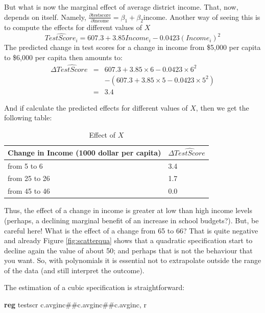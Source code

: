 \documentclass[
]{book}
\newenvironment{Shaded}{\begin{snugshade}}{\end{snugshade}}
\newcommand{\FunctionTok}[1]{\textcolor[rgb]{0.00,0.00,0.00}{#1}}
\newcommand{\KeywordTok}[1]{\textcolor[rgb]{0.13,0.29,0.53}{\textbf{#1}}}
\newcommand{\NormalTok}[1]{#1}
\begin{document}
But what is now the marginal effect of average district income. That, now, depends on itself. Namely, \(\frac{\partial \text{testscore}}{\partial \text{income}} = \beta_1 + \beta_2 \text{income}\). Another way of seeing this is to compute the effects for different values of \(X\)
\begin{equation}
\widehat{TestScore_i} = 607.3 + 3.85 Income_i - 0.0423(Income_i)^2
\end{equation}
The predicted change in test scores for a change in income from \$5,000 per capita to \$6,000 per capita then amounts to:
\begin{eqnarray}
\Delta \widehat{TestScore} &=& 607.3 + 3.85 \times 6 -  0.0423 \times 6^2 \\
&& - (607.3 + 3.85\times 5 - 0.0423\times 5^2)\\
&=&3.4
\end{eqnarray}

And if calculate the predicted effects for different values of \(X\), then we get the following table:

\begin{table}

\caption{\label{tab:effectqua}Effect of $X$}
\centering
\begin{tabular}[t]{ll}
\toprule
Change in Income (1000 dollar per capita) & $\Delta \widehat{TestScore}$\\
\midrule
from 5 to 6 & 3.4\\
from 25 to 26 & 1.7\\
from 45 to 46 & 0.0\\
\bottomrule
\end{tabular}
\end{table}

Thus, the effect of a change in income is greater at low than high income levels (perhaps, a declining marginal benefit of an increase in school budgets?). But, be careful here! What is the effect of a change from 65 to 66? That is quite negative and already Figure \ref{fig:scatterqua} shows that a quadratic specification start to decline again the value of about 50; and perhaps that is not the behaviour that you want. So, with polynomials it is essential not to extrapolate outside the range of the data (and still interpret the outcome).

The estimation of a cubic specification is straightforward:

\begin{Shaded}
\begin{Highlighting}[]
\KeywordTok{reg}\NormalTok{ testscr c.avginc\#\#c.avginc\#\#c.avginc, }\FunctionTok{r}
\end{Highlighting}
\end{Shaded}
\end{document}
